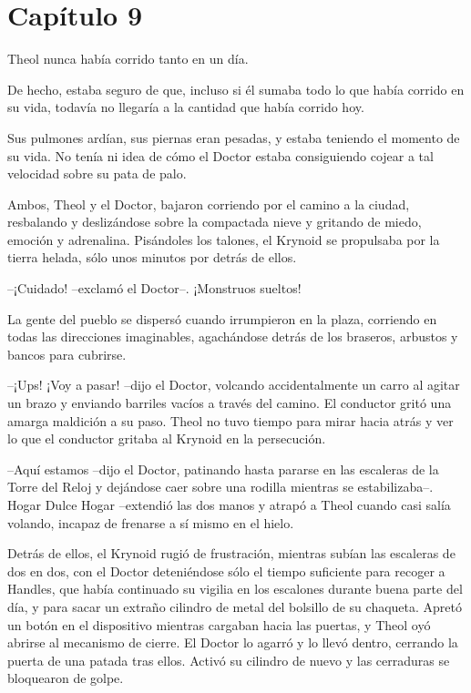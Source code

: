 \chapter*{Capítulo 9}

Theol nunca había corrido tanto en un día.



De hecho, estaba seguro de que, incluso si él sumaba todo lo que había corrido en su vida, todavía no llegaría a la cantidad que había corrido hoy.



Sus pulmones ardían, sus piernas eran pesadas, y estaba teniendo el momento de su vida. No tenía ni idea de cómo el Doctor estaba consiguiendo cojear a tal velocidad sobre su pata de palo.



Ambos, Theol y el Doctor, bajaron corriendo por el camino a la ciudad, resbalando y deslizándose sobre la compactada nieve y gritando de miedo, emoción y adrenalina. Pisándoles los talones, el Krynoid se propulsaba por la tierra helada, sólo unos minutos por detrás de ellos.



--¡Cuidado! --exclamó el Doctor--. ¡Monstruos sueltos!



La gente del pueblo se dispersó cuando irrumpieron en la plaza, corriendo en todas las direcciones imaginables, agachándose detrás de los braseros, arbustos y bancos para cubrirse.



--¡Ups! ¡Voy a pasar! --dijo el Doctor, volcando accidentalmente un carro al agitar un brazo y enviando barriles vacíos a través del camino. El conductor gritó una amarga maldición a su paso. Theol no tuvo tiempo para mirar hacia atrás y ver lo que el conductor gritaba al Krynoid en la persecución.



--Aquí estamos --dijo el Doctor, patinando hasta pararse en las escaleras de la Torre del Reloj y dejándose caer sobre una rodilla mientras se estabilizaba--. Hogar Dulce Hogar --extendió las dos manos y atrapó a Theol cuando casi salía volando, incapaz de frenarse a sí mismo en el hielo.



Detrás de ellos, el Krynoid rugió de frustración, mientras subían las escaleras de dos en dos, con el Doctor deteniéndose sólo el tiempo suficiente para recoger a Handles, que había continuado su vigilia en los escalones durante buena parte del día, y para sacar un extraño cilindro de metal del bolsillo de su chaqueta. Apretó un botón en el dispositivo mientras cargaban hacia las puertas, y Theol oyó abrirse al mecanismo de cierre. El Doctor lo agarró y lo llevó dentro, cerrando la puerta de una patada tras ellos. Activó su cilindro de nuevo y las cerraduras se bloquearon de golpe.



